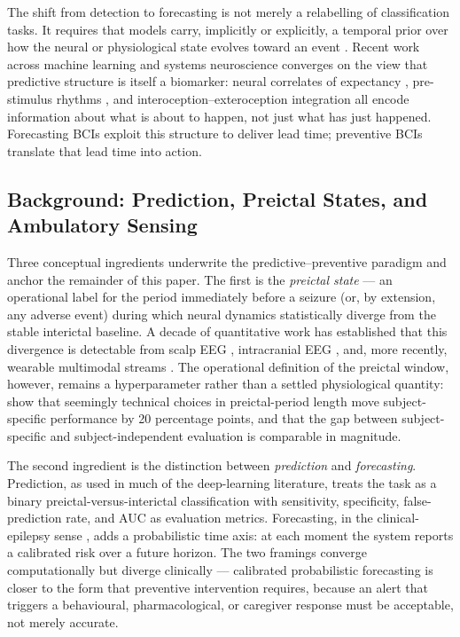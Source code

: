 The shift from detection to forecasting is not merely a relabelling of classification tasks. It requires that models carry, implicitly or explicitly, a temporal prior over how the neural or physiological state evolves toward an event \cite{GunasekaranEtAl2025,ChenEtAl2026b}. Recent work across machine learning and systems neuroscience converges on the view that predictive structure is itself a biomarker: neural correlates of expectancy \cite{KölblEtAl2025}, pre-stimulus rhythms \cite{EguinoaEtAl2026}, and interoception--exteroception integration \cite{BalarKapila2025} all encode information about what is about to happen, not just what has just happened. Forecasting BCIs exploit this structure to deliver lead time; preventive BCIs translate that lead time into action.

\subsection{Background: Prediction, Preictal States, and Ambulatory Sensing}
\label{sec:intro-background}

Three conceptual ingredients underwrite the predictive--preventive paradigm and anchor the remainder of this paper. The first is the \emph{preictal state} --- an operational label for the period immediately before a seizure (or, by extension, any adverse event) during which neural dynamics statistically diverge from the stable interictal baseline. A decade of quantitative work has established that this divergence is detectable from scalp EEG \cite{GuoEtAl2023,Chen2023,ChoiEtAl2022}, intracranial EEG \cite{WangEtAl2026a,ZhouEtAl2026a,QamarEtAl2025}, and, more recently, wearable multimodal streams \cite{NasseriEtAl2021,YamakawaEtAl2020,HasijaEtAl2025}. The operational definition of the preictal window, however, remains a hyperparameter rather than a settled physiological quantity: \citet{KoutsouvelisEtAl2024} show that seemingly technical choices in preictal-period length move subject-specific performance by 20 percentage points, and that the gap between subject-specific and subject-independent evaluation is comparable in magnitude.

The second ingredient is the distinction between \emph{prediction} and \emph{forecasting}. Prediction, as used in much of the deep-learning literature, treats the task as a binary preictal-versus-interictal classification with sensitivity, specificity, false-prediction rate, and AUC as evaluation metrics. Forecasting, in the clinical-epilepsy sense \cite{CostaEtAl2024,FengEtAl2025,FengEtAl2026}, adds a probabilistic time axis: at each moment the system reports a calibrated risk over a future horizon. The two framings converge computationally but diverge clinically --- calibrated probabilistic forecasting is closer to the form that preventive intervention requires, because an alert that triggers a behavioural, pharmacological, or caregiver response must be acceptable, not merely accurate.

